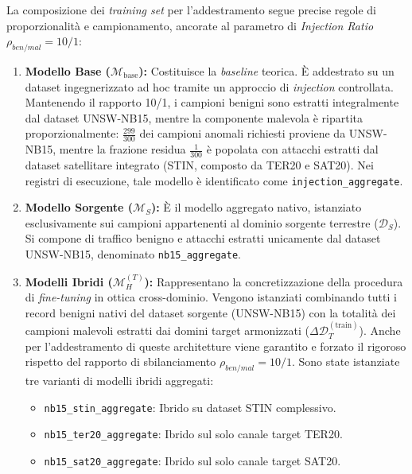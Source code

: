 La composizione dei \textit{training set} per l'addestramento segue precise regole di proporzionalità e campionamento, ancorate al parametro di \textit{Injection Ratio} $\rho_{ben/mal} = 10/1$:
\begin{enumerate}
    \item \textbf{Modello Base ($\mathcal{M}_{\text{base}}$):} Costituisce la \textit{baseline} teorica. 
    È addestrato su un dataset ingegnerizzato ad hoc tramite un approccio di \textit{injection} controllata. 
    Mantenendo il rapporto 10/1, i campioni benigni sono estratti integralmente dal dataset UNSW-NB15, mentre la componente malevola è ripartita proporzionalmente: $\frac{299}{300}$ dei campioni anomali richiesti proviene da UNSW-NB15, mentre la frazione residua $\frac{1}{300}$ è popolata con attacchi estratti dal dataset satellitare integrato (STIN, composto da TER20 e SAT20). 
    Nei registri di esecuzione, tale modello è identificato come \texttt{injection\_aggregate}.
    
    \item \textbf{Modello Sorgente ($\mathcal{M}_S$):} È il modello aggregato nativo, istanziato esclusivamente sui campioni appartenenti al dominio sorgente terrestre ($\mathcal{D}_S$). 
    Si compone di traffico benigno e attacchi estratti unicamente dal dataset UNSW-NB15, denominato \texttt{nb15\_aggregate}.
    
    \item \textbf{Modelli Ibridi ($\mathcal{M}_H^{(T)}$):} Rappresentano la concretizzazione della procedura di \textit{fine-tuning} in ottica cross-dominio. 
    Vengono istanziati combinando tutti i record benigni nativi del dataset sorgente (UNSW-NB15) con la totalità dei campioni malevoli estratti dai domini target armonizzati ($\Delta\mathcal{D}_T^{(\text{train})}$). 
    Anche per l'addestramento di queste architetture viene garantito e forzato il rigoroso rispetto del rapporto di sbilanciamento $\rho_{ben/mal} = 10/1$. 
    Sono state istanziate tre varianti di modelli ibridi aggregati:
    \begin{itemize}
        \item \texttt{nb15\_stin\_aggregate}: Ibrido su dataset STIN complessivo.
        \item \texttt{nb15\_ter20\_aggregate}: Ibrido sul solo canale target TER20.
        \item \texttt{nb15\_sat20\_aggregate}: Ibrido sul solo canale target SAT20.
    \end{itemize}
\end{enumerate}


